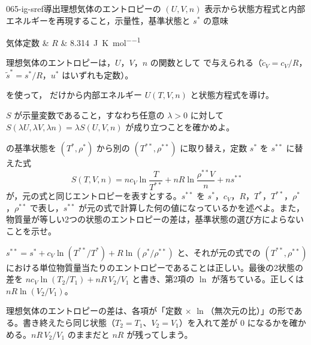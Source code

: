 \documentclass[uplatex,dvipdfmx,a4paper,11pt]{jsarticle}
\begin{document}
\begin{mondai}{065-ig-sref}{導出}{理想気体のエントロピーの $(U,V,n)$ 表示から状態方程式と内部エネルギーを再現すること，示量性，基準状態と $s^{*}$ の意味}
\begin{teisuu}
  気体定数 & $R$ & \qty{8.314}{\joule\per\kelvin\per\mole}\\
\end{teisuu}
理想気体のエントロピーは，$U$，$V$，$n$ の関数として  で与えられる（$\tilde{c}_{V} = c_{V}/R$，$\tilde{s}^{*} = s^{*}/R$，$u^{*}$ はいずれも定数）。
  \begin{shoumon}
    \item {} を使って， だけから内部エネルギー $U(T,V,n)$ と状態方程式を導け。
    \item $S$ が示量変数であること，すなわち任意の $\lambda > 0$ に対して $S(\lambda U,\lambda V,\lambda n) = \lambda S(U,V,n)$ が成り立つことを確かめよ。
    \item {} の基準状態を $(T^{*},\rho^{*})$ から別の $(T^{**},\rho^{**})$ に取り替え，定数 $s^{*}$ を $s^{**}$ に替えた式
    \[ S(T,V,n) = nc_{V}\ln\frac{T}{T^{**}} + nR\ln\frac{\rho^{**}V}{n} + ns^{**} \]
    が，元の式と同じエントロピーを表すとする。$s^{**}$ を $s^{*}$，$c_{V}$，$R$，$T^{*}$，$T^{**}$，$\rho^{*}$，$\rho^{**}$ で表し，$s^{**}$ が元の式で計算した何の値になっているかを述べよ。また，物質量が等しい2つの状態のエントロピーの差は，基準状態の選び方によらないことを示せ。
  \end{shoumon}

\begin{kotaeran}
   $s^{**}=s^{*}+c_{V}\ln(T^{**}/T^{*})+R\ln(\rho^{*}/\rho^{**})$ と、それが元の式での $(T^{**},\rho^{**})$ における単位物質量当たりのエントロピーであることは正しい。最後の2状態の差を $nc_{V}\ln(T_{2}/T_{1})+nR\,V_{2}/V_{1}$ と書き、第2項の $\ln$ が落ちている。正しくは $nR\ln(V_{2}/V_{1})$。
\end{kotaeran}
\begin{rikai}
  \item 理想気体のエントロピーの差は、各項が「定数 $\times$ $\ln$（無次元の比）」の形である。書き終えたら同じ状態（$T_{2}=T_{1}$、$V_{2}=V_{1}$）を入れて差が $0$ になるかを確かめる。$nR\,V_{2}/V_{1}$ のままだと $nR$ が残ってしまう。
\end{rikai}
\end{mondai}
\end{document}
